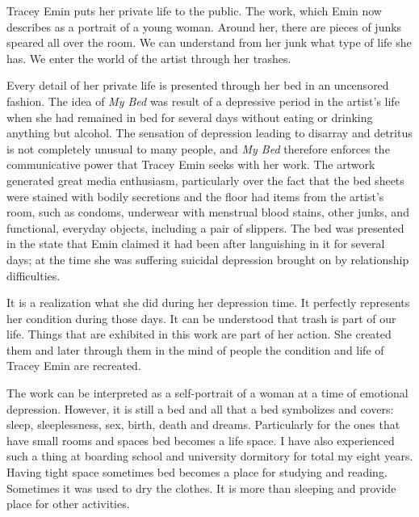 Tracey Emin puts her private life to the public. The work, which Emin now describes as a portrait of a young woman. Around her, there are pieces of junks speared all over the room. We can understand from her junk what type of life she has. We enter the world of the artist through her trashes.

Every detail of her private life is presented through her bed in an uncensored fashion. The idea of \textit{My Bed} was result of a depressive period in the artist’s life when she had remained in bed for several days without eating or drinking anything but alcohol. The sensation of depression leading to disarray and detritus is not completely unusual to many people, and \textit{My Bed} therefore enforces the communicative power that Tracey Emin seeks with her work. The artwork generated great media enthusiasm, particularly over the fact that the bed sheets were stained with bodily secretions and the floor had items from the artist’s room, such as condoms, underwear with menstrual blood stains, other junks, and functional, everyday objects, including a pair of slippers. The bed was presented in the state that Emin claimed it had been after languishing in it for several days; at the time she was suffering suicidal depression brought on by relationship difficulties.

It is a realization what she did during her depression time. It perfectly represents her condition during those days. It can be understood that trash is part of our life. Things that are exhibited in this work are part of her action. She created them and later through them in the mind of people the condition and life of Tracey Emin are recreated. 

The work can be interpreted as a self-portrait of a woman at a time of emotional depression. However, it is still a bed and all that a bed symbolizes and covers: sleep, sleeplessness, sex, birth, death and dreams. Particularly for the ones that have small rooms and spaces bed becomes a life space. I have also experienced such a thing at boarding school and university dormitory for total my eight years. Having tight space sometimes bed becomes a place for studying and reading. Sometimes it was used to dry the clothes. It is more than sleeping and provide place for other activities.





